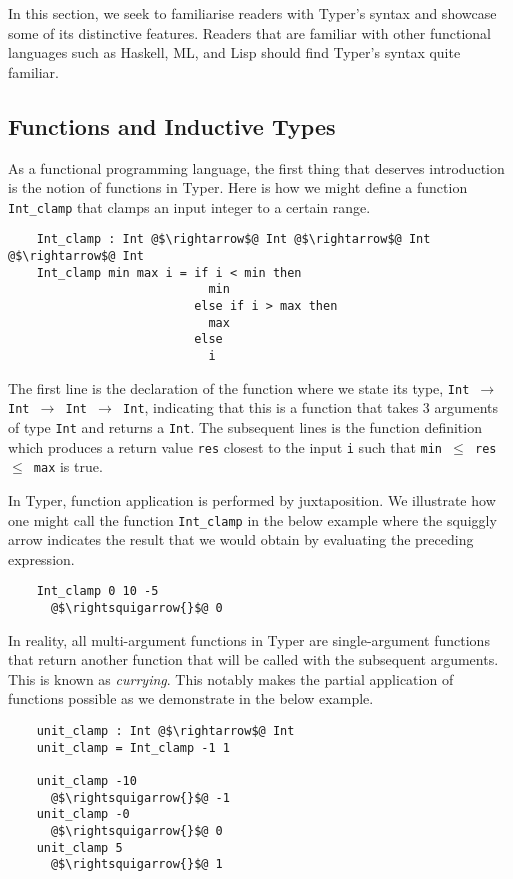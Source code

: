 \documentclass[12pt,twoside,maitrise]{dms}
\theoremstyle{definition}
\numberwithin{equation}{section}
\numberwithin{table}{chapter}
\numberwithin{figure}{chapter}
\newcommand\id[1] {\texttt{#1}}
\newcommand\fn[1] {\texttt{#1}}
\begin{document}
In this section, we seek to familiarise readers with Typer's syntax and
showcase some of its distinctive features. Readers that are familiar with other
functional languages such as Haskell, ML, and Lisp should find Typer's syntax
quite familiar.

\subsection{Functions and Inductive Types}
As a functional programming language, the first thing that
deserves introduction is the notion of functions in Typer. Here is how we might
define a function \id{Int\_clamp} that clamps an input integer to a certain
range.

\begin{verbatim}
    Int_clamp : Int @$\rightarrow$@ Int @$\rightarrow$@ Int @$\rightarrow$@ Int
    Int_clamp min max i = if i < min then 
                            min 
                          else if i > max then 
                            max
                          else
                            i
\end{verbatim}

The first line is the declaration of the function where we state its type,
\fn{Int $\rightarrow$ Int $\rightarrow$ Int $\rightarrow$ Int}, indicating that
this is a function that takes 3 arguments of type \id{Int} and returns a
\id{Int}. The subsequent lines is the function definition which produces a
return value \id{res} closest to the input \id{i} such that \fn{min $\le$ res
$\le$ max} is true.

In Typer, function application is performed by juxtaposition. We illustrate how
one might call the function \id{Int\_clamp} in the below example where the
squiggly arrow indicates the result that we would obtain by evaluating the
preceding expression.

\begin{verbatim}
    Int_clamp 0 10 -5
      @$\rightsquigarrow{}$@ 0
\end{verbatim}

In reality, all multi-argument functions in Typer are single-argument functions
that return another function that will be called with the subsequent arguments.
This is known as \emph{currying}. This notably makes the partial application of 
functions possible as we demonstrate in the below example.

\begin{verbatim}
    unit_clamp : Int @$\rightarrow$@ Int
    unit_clamp = Int_clamp -1 1

    unit_clamp -10
      @$\rightsquigarrow{}$@ -1
    unit_clamp -0
      @$\rightsquigarrow{}$@ 0
    unit_clamp 5
      @$\rightsquigarrow{}$@ 1
\end{verbatim}
\end{document}
